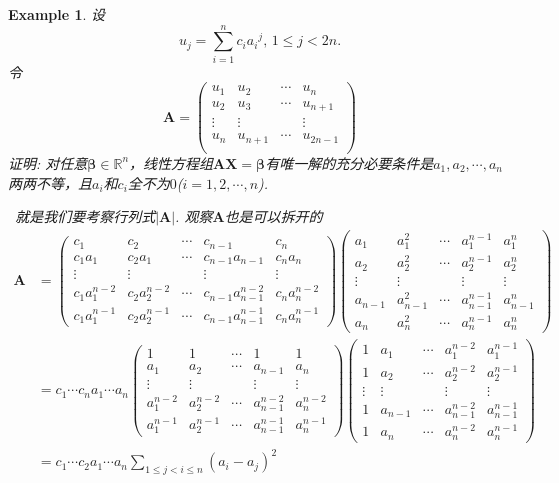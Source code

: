\documentclass{article}
\newtheorem{example}[theorem]{Example}
\newcommand{\hints}{{\color{blue} \text{hints}}}
\newcommand{\mbf}[1]{\bm{#1}}
\begin{document}
\begin{example}
\rm 设
$$
u_j = \sum\limits_{i=1}^{n}c_i{a_i}^{j},\, 1 \leq j < 2n. 
$$
令
$$
\mbf{A} = \begin{pmatrix}
u_1 & u_2 & \cdots & u_n \\
u_2 & u_3 & \cdots & u_{n+1} \\
\vdots & \vdots &  & \vdots \\
u_n & u_{n+1} & \cdots & u_{2n-1}\\
\end{pmatrix}
$$
证明: 对任意$\mbf{\beta} \in \mathbb{R}^n$，线性方程组$\mbf{A}\mbf{X} = \mbf{\beta}$有唯一解的充分必要条件是$a_1,a_2,\cdots,a_n$两两不等，且$a_i$和$c_i$全不为$0$($i=1,2,\cdots,n$). 

\hints\ 就是我们要考察行列式$|\mbf{A}|$. 观察$\mbf{A}$也是可以拆开的
$$
\begin{array}{ll}
\mbf{A} &= \begin{pmatrix}
c_1 & c_2 & \cdots & c_{n-1} & c_n \\
c_1a_1 & c_2a_1 & \cdots & c_{n-1}a_{n-1} & c_na_n \\
\vdots & \vdots &  & \vdots & \vdots \\
c_1a_1^{n-2} & c_2a_2^{n-2} & \cdots & c_{n-1}a_{n-1}^{n-2} & c_na_n^{n-2} \\
c_1a_1^{n-1} & c_2a_2^{n-1} & \cdots & c_{n-1}a_{n-1}^{n-1} & c_na_n^{n-1}
\end{pmatrix} 
\begin{pmatrix}
a_1 & a_1^2 & \cdots & a_1^{n-1} & a_1^n \\
a_2 & a_2^2 & \cdots & a_2^{n-1} & a_2^n \\
\vdots & \vdots &  & \vdots & \vdots \\
a_{n-1} & a_{n-1}^2 & \cdots & a_{n-1}^{n-1} & a_{n-1}^{n} \\
a_{n} & a_n^2 & \cdots & a_n^{n-1} & a_n^{n}  
\end{pmatrix} \\
&= c_1\cdots c_n a_1\cdots a_n \begin{pmatrix}
1 & 1 & \cdots & 1 & 1 \\
a_1 & a_2 & \cdots & a_{n-1} & a_n \\
\vdots & \vdots &  & \vdots & \vdots \\
a_1^{n-2} & a_2^{n-2} & \cdots & a_{n-1}^{n-2} & a_n^{n-2} \\
a_1^{n-1} & a_2^{n-1} & \cdots & a_{n-1}^{n-1} & a_n^{n-1}
\end{pmatrix} 
\begin{pmatrix}
1 & a_1 & \cdots & a_1^{n-2} & a_1^{n-1} \\
1 & a_2 & \cdots & a_2^{n-2} & a_2^{n-1} \\
\vdots & \vdots &  & \vdots & \vdots \\
1 & a_{n-1} & \cdots & a_{n-1}^{n-2} & a_{n-1}^{n-1} \\
1 & a_n & \cdots & a_n^{n-2} & a_n^{n-1}  
\end{pmatrix} \\
&= c_1\cdots c_2 a_1 \cdots a_n \sum\limits_{1 \leq j < i \leq n}(a_i -a_j)^2  
\end{array}
$$
\end{example}
\end{document}
